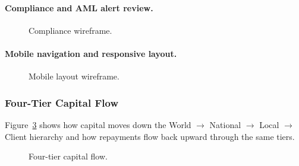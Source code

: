 \paragraph{Compliance and AML alert review.}
\begin{figure}[H]
\centering
{}
\caption[Compliance wireframe]{Compliance wireframe.}
\label{fig:ui-wireframe-compliance}
\end{figure}

\paragraph{Mobile navigation and responsive layout.}
\begin{figure}[H]
\centering
{}
\caption[Mobile layout wireframe]{Mobile layout wireframe.}
\label{fig:ui-wireframe-mobile}
\end{figure}

\subsubsection{Four-Tier Capital Flow}

Figure~\ref{fig:four-tier} shows how capital moves down the World $\to$ National $\to$ Local $\to$ Client hierarchy and how repayments flow back upward through the same tiers.

\begin{figure}[H]
\centering
{}
\caption[Four-tier capital flow]{Four-tier capital flow.}
\label{fig:four-tier}
\end{figure}


%
%
%


